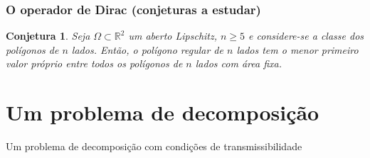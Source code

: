\documentclass[portuguese,notheorems]{beamer}
\newtheorem{conjecture}[theorem]{Conjetura}
\begin{document}
\begin{frame}\frametitle{O operador de Dirac (conjeturas a estudar)}
    \begin{conjecture}\label{polya_szego_conjecture_dirac}
        Seja \(\Omega \subset \mathbb{R}^2\) um aberto Lipschitz, \(n \geq 5\) e considere-se a classe dos polígonos de \(n\) lados. Então, o polígono regular de \(n\) lados tem o menor primeiro valor próprio entre todos os polígonos de \(n\) lados com área fixa.
    \end{conjecture}
\end{frame}

\section{Um problema de decomposição}

\begin{frame}
    \centering
    \LARGE
    Um problema de decomposição com condições de transmissibilidade
\end{frame}
\end{document}
